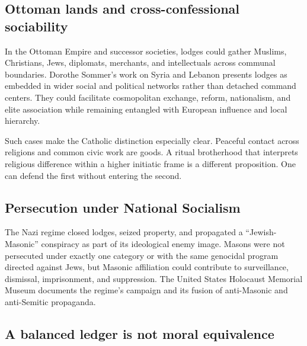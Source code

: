 \subsection{Ottoman lands and cross-confessional sociability}

In the Ottoman Empire and successor societies, lodges could gather Muslims, Christians, Jews, diplomats, merchants, and intellectuals across communal boundaries. Dorothe Sommer's work on Syria and Lebanon presents lodges as embedded in wider social and political networks rather than detached command centers. They could facilitate cosmopolitan exchange, reform, nationalism, and elite association while remaining entangled with European influence and local hierarchy.

Such cases make the Catholic distinction especially clear. Peaceful contact across religions and common civic work are goods. A ritual brotherhood that interprets religious difference within a higher initiatic frame is a different proposition. One can defend the first without entering the second.

\subsection{Persecution under National Socialism}

The Nazi regime closed lodges, seized property, and propagated a “Jewish-Masonic” conspiracy as part of its ideological enemy image. Masons were not persecuted under exactly one category or with the same genocidal program directed against Jews, but Masonic affiliation could contribute to surveillance, dismissal, imprisonment, and suppression. The United States Holocaust Memorial Museum documents the regime's campaign and its fusion of anti-Masonic and anti-Semitic propaganda.

\subsection{A balanced ledger is not moral equivalence}

